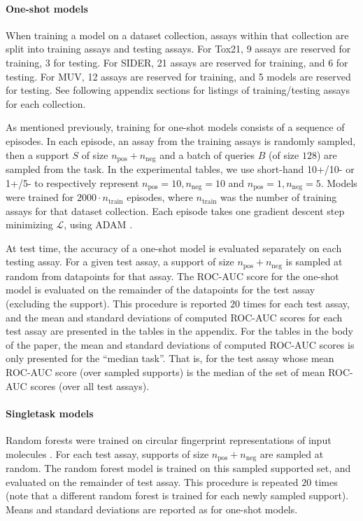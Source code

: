 \paragraph{One-shot models}
When training a model on a dataset collection, assays within that collection are split into training assays and testing assays. For Tox21, 9 assays are reserved for training, 3 for testing. For SIDER, 21 assays are reserved for training, and 6 for testing. For MUV, 12 assays are reserved for training, and 5 models are reserved for testing. See following appendix sections for listings of training/testing assays for each collection.

As mentioned previously, training for one-shot models consists of a sequence of episodes. In each episode, an assay from the training assays is randomly sampled, then a support $S$ of size $n_\textrm{pos} + n_\textrm{neg}$ and a batch of queries $B$ (of size $128$) are sampled from the task. In the experimental tables, we use short-hand 10+/10- or 1+/5- to respectively represent $n_\textrm{pos} = 10, n_\textrm{neg}=10$ and $n_\textrm{pos}=1,n_\textrm{neg}=5$. Models were trained for $2000\cdot n_\textrm{train}$ episodes, where $n_\textrm{train}$ was the number of training assays for that dataset collection. Each episode takes one gradient descent step minimizing $\mathcal{L}$, using ADAM \cite{kingma2014adam}.

At test time, the accuracy of a one-shot model is evaluated separately on each testing assay. For a given test assay, a support of size $n_\textrm{pos} + n_\textrm{neg}$ is sampled at random from datapoints for that assay. The ROC-AUC score for the one-shot model is evaluated on the remainder of the datapoints for the test assay (excluding the support). This procedure is reported $20$ times for each test assay, and the mean and standard deviations of computed ROC-AUC scores for each test assay are presented in the tables in the appendix. For the tables in the body of the paper, the mean and standard deviations of computed ROC-AUC scores is only presented for the ``median task''. That is, for the test assay whose mean ROC-AUC score (over sampled supports) is the median of the set of mean ROC-AUC scores (over all test assays).

\paragraph{Singletask models}
Random forests were trained on circular fingerprint representations of input molecules \cite{rogers2010extended}. For each test assay, supports of size $n_\textrm{pos} + n_\textrm{neg}$ are sampled at random. The random forest model is trained on this sampled supported set, and evaluated on the remainder of test assay. This procedure is repeated $20$ times (note that a different random forest is trained for each newly sampled support). Means and standard deviations are reported as for one-shot models.

